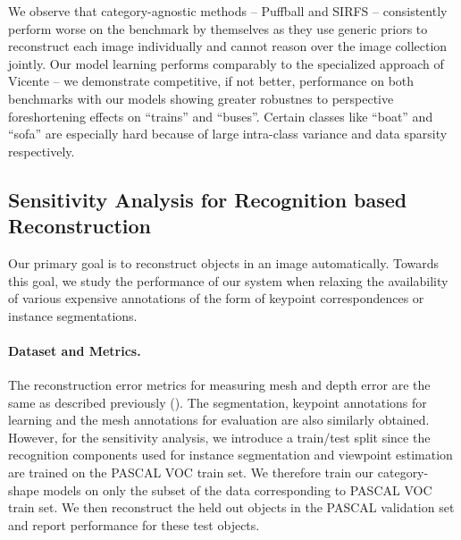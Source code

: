 We observe that category-agnostic methods -- Puffball\cite{twarog2012playing} and SIRFS\cite{barronPAMI13, Barron2012B} -- consistently perform worse on the benchmark by themselves as they use generic priors to reconstruct each image individually and cannot reason over the image collection jointly. Our model learning performs comparably to the specialized approach of Vicente \etal -- we demonstrate competitive, if not better, performance on both benchmarks with our models showing greater robustnes to perspective foreshortening effects on ``trains'' and ``buses''.  Certain classes like ``boat'' and ``sofa'' are especially hard because of large intra-class variance and data sparsity respectively.

% 

\subsection{Sensitivity Analysis for Recognition based Reconstruction} 



Our primary goal is to reconstruct objects in an image automatically. Towards this goal, we study the performance of our system when relaxing the availability of various  expensive annotations of the form of keypoint correspondences or instance segmentations. 


\paragraph{Dataset and Metrics.}
The reconstruction error metrics for measuring mesh and depth error are the same as described previously (). The segmentation, keypoint annotations for learning and the mesh annotations for evaluation are also similarly obtained. However, for the sensitivity analysis, we introduce a train/test split since the recognition components used for instance segmentation and viewpoint estimation are trained on the PASCAL VOC train set. We therefore train our category-shape models  on only the subset of the data corresponding to PASCAL VOC train set. We then reconstruct the held out objects in the PASCAL validation set and report performance for these test objects.


